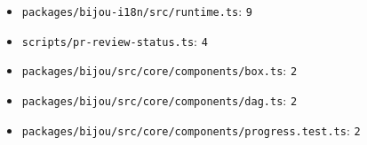 \begin{itemize}
\tightlist
\item
  \texttt{p\allowbreak{}a\allowbreak{}c\allowbreak{}k\allowbreak{}a\allowbreak{}g\allowbreak{}e\allowbreak{}s\allowbreak{}/\allowbreak{}b\allowbreak{}i\allowbreak{}j\allowbreak{}o\allowbreak{}u\allowbreak{}-\allowbreak{}i\allowbreak{}1\allowbreak{}8\allowbreak{}n\allowbreak{}/\allowbreak{}s\allowbreak{}r\allowbreak{}c\allowbreak{}/\allowbreak{}r\allowbreak{}u\allowbreak{}n\allowbreak{}t\allowbreak{}i\allowbreak{}m\allowbreak{}e\allowbreak{}.\allowbreak{}t\allowbreak{}s}: \texttt{9}
\item
  \texttt{s\allowbreak{}c\allowbreak{}r\allowbreak{}i\allowbreak{}p\allowbreak{}t\allowbreak{}s\allowbreak{}/\allowbreak{}p\allowbreak{}r\allowbreak{}-\allowbreak{}r\allowbreak{}e\allowbreak{}v\allowbreak{}i\allowbreak{}e\allowbreak{}w\allowbreak{}-\allowbreak{}s\allowbreak{}t\allowbreak{}a\allowbreak{}t\allowbreak{}u\allowbreak{}s\allowbreak{}.\allowbreak{}t\allowbreak{}s}: \texttt{4}
\item
  \texttt{p\allowbreak{}a\allowbreak{}c\allowbreak{}k\allowbreak{}a\allowbreak{}g\allowbreak{}e\allowbreak{}s\allowbreak{}/\allowbreak{}b\allowbreak{}i\allowbreak{}j\allowbreak{}o\allowbreak{}u\allowbreak{}/\allowbreak{}s\allowbreak{}r\allowbreak{}c\allowbreak{}/\allowbreak{}c\allowbreak{}o\allowbreak{}r\allowbreak{}e\allowbreak{}/\allowbreak{}c\allowbreak{}o\allowbreak{}m\allowbreak{}p\allowbreak{}o\allowbreak{}n\allowbreak{}e\allowbreak{}n\allowbreak{}t\allowbreak{}s\allowbreak{}/\allowbreak{}b\allowbreak{}o\allowbreak{}x\allowbreak{}.\allowbreak{}t\allowbreak{}s}: \texttt{2}
\item
  \texttt{p\allowbreak{}a\allowbreak{}c\allowbreak{}k\allowbreak{}a\allowbreak{}g\allowbreak{}e\allowbreak{}s\allowbreak{}/\allowbreak{}b\allowbreak{}i\allowbreak{}j\allowbreak{}o\allowbreak{}u\allowbreak{}/\allowbreak{}s\allowbreak{}r\allowbreak{}c\allowbreak{}/\allowbreak{}c\allowbreak{}o\allowbreak{}r\allowbreak{}e\allowbreak{}/\allowbreak{}c\allowbreak{}o\allowbreak{}m\allowbreak{}p\allowbreak{}o\allowbreak{}n\allowbreak{}e\allowbreak{}n\allowbreak{}t\allowbreak{}s\allowbreak{}/\allowbreak{}d\allowbreak{}a\allowbreak{}g\allowbreak{}.\allowbreak{}t\allowbreak{}s}: \texttt{2}
\item
  \texttt{p\allowbreak{}a\allowbreak{}c\allowbreak{}k\allowbreak{}a\allowbreak{}g\allowbreak{}e\allowbreak{}s\allowbreak{}/\allowbreak{}b\allowbreak{}i\allowbreak{}j\allowbreak{}o\allowbreak{}u\allowbreak{}/\allowbreak{}s\allowbreak{}r\allowbreak{}c\allowbreak{}/\allowbreak{}c\allowbreak{}o\allowbreak{}r\allowbreak{}e\allowbreak{}/\allowbreak{}c\allowbreak{}o\allowbreak{}m\allowbreak{}p\allowbreak{}o\allowbreak{}n\allowbreak{}e\allowbreak{}n\allowbreak{}t\allowbreak{}s\allowbreak{}/\allowbreak{}p\allowbreak{}r\allowbreak{}o\allowbreak{}g\allowbreak{}r\allowbreak{}e\allowbreak{}s\allowbreak{}s\allowbreak{}.\allowbreak{}t\allowbreak{}e\allowbreak{}s\allowbreak{}t\allowbreak{}.\allowbreak{}t\allowbreak{}s}: \texttt{2}

\end{itemize}
